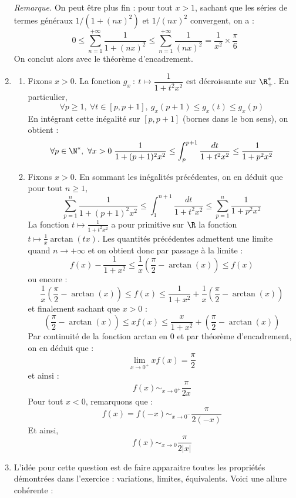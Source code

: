 \documentclass[a4paper,10pt]{report}
\begin{document}
\begin{enumerate}
\medskip

\noindent \textit{Remarque.} On peut être plus fin : pour tout $x>1$, sachant que les séries de termes généraux $1/(1+(nx)^2)$ et $1/(nx)^2$ convergent, on a :
$$ 0 \leq \sum_{n=1}^{+ \infty} \dfrac{1}{1+(nx)^2} \leq \sum_{n=1}^{+ \infty} \dfrac{1}{(nx)^2} = \frac{1}{x^2} \times \frac{\pi}{6}$$
On conclut alors avec le théorème d'encadrement.
\item
\begin{enumerate}
\item Fixons $x>0$. La fonction $g_x\ :\ t\mapsto \dfrac{1}{1+t^2x^2}$ est d\'ecroissante sur $\R_+^{*}$. En particulier,
\[\forall p\geq 1,\ \forall t\in [p,p+1],\ g_x(p+1)\leq g_x(t)\leq g_x(p)\]
En int\'egrant cette in\'egalit\'e sur $[p,p+1]$ (bornes dans le bon sens), on obtient :
\[\forall p\in \N^*,\ \forall x>0 \; \frac{1}{1+(p+1)^2x^2}\leq \int_p^{p+1}\frac{dt}{1+t^2x^2}\leq \frac{1}{1+p^2x^2}\]
\item Fixons $x>0$. En sommant les inégalités précédentes, on en déduit que pour tout $n \geq 1$,
\[ \sum_{p=1}^n \frac{1}{1+(p+1)^2x^2}\leq \int_1^{n+1}\frac{dt}{1+t^2x^2}\leq \sum_{p=1}^n\frac{1}{1+p^2x^2}\]
La fonction $t\mapsto \frac{1}{1+t^2x^2}$ a pour primitive sur $\R$ la fonction $t\mapsto \frac{1}{x}\arctan(tx)$. Les quantit\'es pr\'ec\'edentes admettent une limite quand $n \rightarrow +\infty$ et on obtient donc par passage à la limite :
\[f(x)-\frac{1}{1+x^2}\leq \frac{1}{x} \left(\frac{\pi}{2} - \arctan(x) \right) \leq f(x)\]
ou encore :
\[ \frac{1}{x} \left(\frac{\pi}{2} - \arctan(x) \right)\leq f(x)\leq \frac{1}{1+x^2}+ \frac{1}{x} \left(\frac{\pi}{2} - \arctan(x) \right)\]
et finalement sachant que $x>0$ :
$$ \left(\frac{\pi}{2} - \arctan(x) \right) \leq x f(x) \leq \frac{x}{1+x^2}  +\left(\frac{\pi}{2} - \arctan(x) \right) $$
Par continuité de la fonction arctan en $0$ et par théorème d'encadrement, on en déduit que :
$$ \lim_{x \rightarrow 0^+} x f(x) = \frac{\pi}{2}$$
et ainsi :
\[f(x)\mathop{\sim}_{x\to 0^+} \frac{\pi}{2x}\]
Pour tout $x<0$, remarquons que :
\[f(x)=f(-x) \mathop{\sim}_{x\to 0^{-}} \frac{\pi}{2(-x)}\]
Et ainsi,
\[f(x)\mathop{\sim}_{x\to 0} \frac{\pi}{2 \vert x \vert }\]
\end{enumerate}
\item L'idée pour cette question est de faire apparaitre toutes les propriétés démontrées dans l'exercice : variations, limites, équivalents. Voici une allure cohérente :


\end{enumerate}
\end{document}
